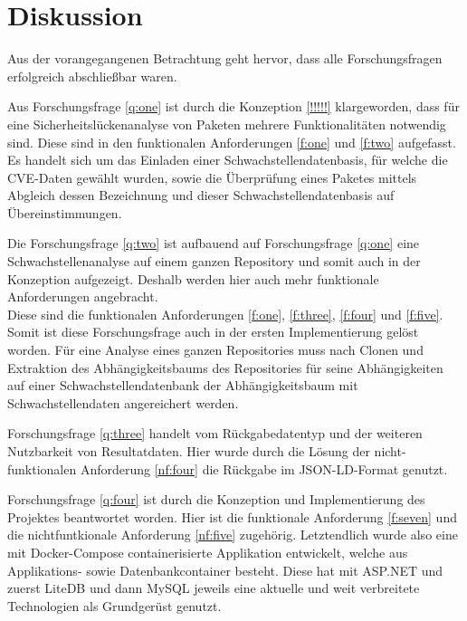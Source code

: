 \section{Diskussion} \label{sec:Diskussion}
    Aus der vorangegangenen Betrachtung geht hervor, dass alle Forschungsfragen erfolgreich abschließbar waren.

    Aus Forschungsfrage \ref{q:one} ist durch die Konzeption \ref{!!!!!} klargeworden, dass für eine Sicherheitslückenanalyse von Paketen mehrere Funktionalitäten notwendig sind.
    Diese sind in den funktionalen Anforderungen \ref{f:one} und \ref{f:two} aufgefasst.
    Es handelt sich um das Einladen einer Schwachstellendatenbasis, für welche die \ac{CVE}-Daten gewählt wurden, sowie die Über\-prüfung eines Paketes mittels Abgleich dessen Bezeichnung und dieser Schwachstellendatenbasis auf Über\-ein\-stimmungen.

    Die Forschungsfrage \ref{q:two} ist aufbauend auf Forschungsfrage \ref{q:one} eine Schwachstellenanalyse auf einem ganzen Repository und somit auch in der Konzeption aufgezeigt.
    Deshalb werden hier auch mehr funktionale Anforderungen angebracht.
    \\
    Diese sind die funktionalen Anforderungen \ref{f:one}, \ref{f:three}, \ref{f:four} und \ref{f:five}.
    Somit ist diese Forschungsfrage auch in der ersten Implementierung gelöst worden.
    Für eine Analyse eines ganzen Repositories muss nach Clonen und Extraktion des Abhängigkeitsbaums des Repositories für seine Abhängigkeiten auf einer Schwachstellendatenbank der Abhängigkeitsbaum mit Schwachstellendaten angereichert werden.

    Forschungsfrage \ref{q:three} handelt vom Rückgabedatentyp und der weiteren Nutzbarkeit von Resultatdaten.
    Hier wurde durch die Lösung der nicht-funktionalen Anforderung \ref{nf:four} die Rückgabe im JSON-LD-Format genutzt.

    Forschungsfrage \ref{q:four} ist durch die Konzeption und Implementierung des Projektes beantwortet worden.
    Hier ist die funktionale Anforderung \ref{f:seven} und die nichtfuntkionale Anforderung \ref{nf:five} zugehörig.
    Letztendlich wurde also eine mit Docker-Compose containerisierte Applikation entwickelt, welche aus Applikations- sowie Datenbankcontainer besteht.
    Diese hat mit ASP.NET und zuerst LiteDB und dann MySQL jeweils eine aktuelle und weit verbreitete Technologien als Grundgerüst genutzt.

